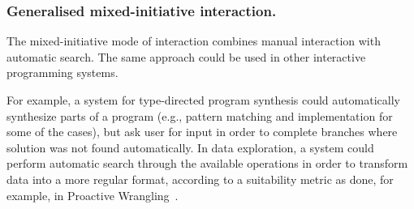 \documentclass[nonacm,anonymous,sigplan,screen]{acmart}
\begin{document}
%
%
%
%
%
%
%
%


\subsubsection*{Generalised mixed-initiative interaction.}
The mixed-initiative mode of interaction combines manual interaction with automatic search.
The same approach could be used in other interactive programming systems.

For example, a system for type-directed program synthesis could automatically synthesize parts
of a program (e.g., pattern matching and implementation for some of the cases), but ask user for
input in order to complete branches where solution was not found automatically.
In data exploration, a system could perform automatic search through the available operations
in order to transform data into a more regular format, according to a suitability
metric as done, for example, in Proactive Wrangling~\cite{guo-2011-proactive}.
\end{document}
